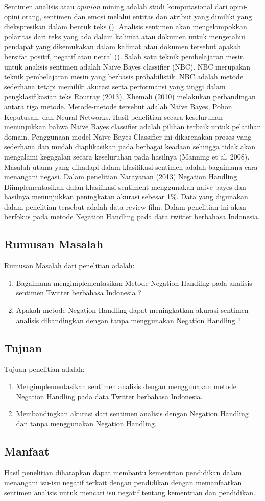 Sentimen analisis atau \textit{opinion} mining adalah studi komputasional dari opini-opini orang, sentimen dan emosi melalui entitas dan atribut yang dimiliki yang diekspresikan dalam bentuk teks \citeauthor{LIU2012} (\cite*{LIU2012}). Analisis sentimen akan mengelompokkan polaritas dari teks yang ada dalam kalimat atau dokumen untuk mengetahui pendapat yang dikemukakan dalam kalimat atau dokumen tersebut apakah bersifat positif, negatif atau netral \cite{Pang+Lee+Vaithyanathan:02a} (\cite*{Pang+Lee+Vaithyanathan:02a}). Salah satu teknik pembelajaran mesin untuk analisis sentimen adalah Naïve Bayes classifier (NBC). NBC merupakan teknik pembelajaran mesin yang berbasis probabilistik. NBC adalah metode sederhana tetapi memiliki akurasi serta performansi yang tinggi dalam pengklasifikasian teks Routray (2013). Xhemali (2010) melakukan perbandingan antara tiga metode. Metode-metode tersebut adalah Naïve Bayes, Pohon Keputusan, dan Neural Networks. Hasil penelitian secara keseluruhan menunjukkan bahwa Naïve Bayes classifier adalah pilihan terbaik untuk pelatihan domain. Penggunaan model Naïve Bayes Classifier ini dikarenakan proses yang sederhana dan mudah diaplikasikan pada berbagai keadaan sehingga tidak akan mengalami kegagalan secara keseluruhan pada hasilnya (Manning et al. 2008).
Masalah utama yang dihadapi dalam klasifikasi sentimen adalah bagaimana cara menangani negasi. Dalam penelitian Narayanan (2013) Negation Handling Diimplementasikan dalan klasifikasi sentiment menggunakan naive bayes dan hasilnya menunjukkan peningkatan akurasi sebesar 1\%. Data yang digunakan dalam penelitian tersebut adalah data review film. Dalam penelitian ini akan berfokus pada metode Negation Handling pada data twitter berbahasa Indonesia.



\subsection*{Rumusan Masalah}
Rumusan Masalah dari penelitian adalah:
\begin{enumerate}[noitemsep] 
	\item Bagaimana mengimplementasikan Metode Negation Handilng pada analisis sentimen Twitter berbahasa Indonesia ?
	\item Apakah metode Negation Handling dapat meningkatkan akurasi sentimen analisis dibandingkan dengan tanpa menggunakan Negation Handling ?
\end{enumerate}

\subsection*{Tujuan}
Tujuan penelitian adalah:
\begin{enumerate}[noitemsep] 
	\item Mengimplementasikan sentimen analisis dengan menggunakan metode Negation Handling pada data Twitter berbahasa Indonesia.
	\item Membandingkan akurasi dari sentimen analisis dengan Negation Handling dan tanpa menggunakan Negation Handling.
\end{enumerate}

\subsection*{Manfaat}
Hasil penelitian diharapkan dapat membantu kementrian pendidikan dalam menangani isu-isu negatif terkait dengan pendidikan dengan memanfaatkan sentimen analisis untuk mencari isu negatif tentang kementrian dan pendidikan.
